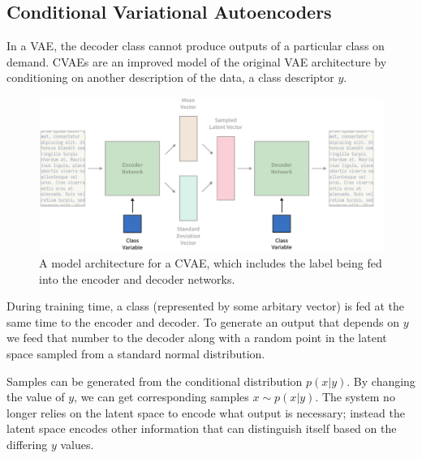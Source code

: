 \documentclass[12pt,twoside]{report}
\begin{document}
\subsection{Conditional Variational Autoencoders}

In a VAE, the decoder class cannot produce outputs of a particular class on demand. CVAEs are an improved model of the original VAE architecture by conditioning on another description of the data, a class descriptor $y$. 

\begin{figure}[!ht]
      
	\centering
	\includegraphics[width=150mm]{diagrams/conditional_variational_autoencoders.pdf}
	\caption{A model architecture for a CVAE, which includes the label being fed into the encoder and decoder networks. \label{cvae_diagram}}
  \end{figure}

During training time, a class (represented by some arbitary vector) is fed at the same time to the encoder and decoder. To generate an output that depends on $y$ we feed that number to the decoder along with a random point in the latent space sampled from a standard normal distribution.

Samples can be generated from the conditional distribution $p(x|y)$. By changing the value of $y$, we can get corresponding samples $x \sim p(x|y)$. The system no longer relies on the latent space to encode what output is necessary; instead the latent space encodes other information that can distinguish itself based on the differing $y$ values.


\end{document}
